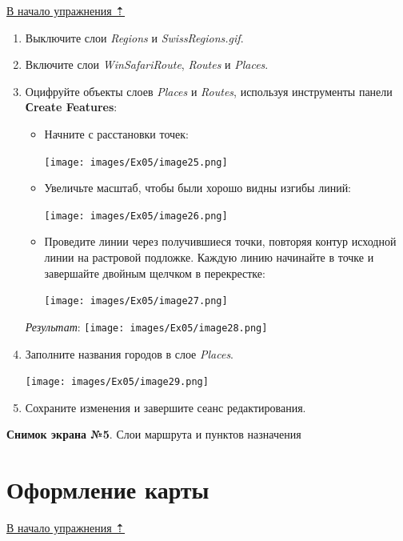 \documentclass[12pt,]{book}
\begin{document}
\protect\hyperlink{map-ref-general}{В начало упражнения ⇡}

\begin{enumerate}
\def\labelenumi{\arabic{enumi}.}
\item
  Выключите слои \emph{Regions} и \emph{SwissRegions.gif}.
\item
  Включите слои \emph{WinSafariRoute}, \emph{Routes} и \emph{Places}.
\item
  Оцифруйте объекты слоев \emph{Places} и \emph{Routes}, используя инструменты панели \textbf{Сreate Features}:

  \begin{itemize}
  \item
    Начните с расстановки точек:

    \texttt{[image: images/Ex05/image25.png]}
  \item
    Увеличьте масштаб, чтобы были хорошо видны изгибы линий:

    \texttt{[image: images/Ex05/image26.png]}
  \item
    Проведите линии через получившиеся точки, повторяя контур исходной линии на растровой подложке. Каждую линию начинайте в точке и завершайте двойным щелчком в перекрестке:

    \texttt{[image: images/Ex05/image27.png]}
  \end{itemize}

  \emph{Результат}:
  \texttt{[image: images/Ex05/image28.png]}
\item
  Заполните названия городов в слое \emph{Places}.

  \texttt{[image: images/Ex05/image29.png]}
\item
  Сохраните изменения и завершите сеанс редактирования.
\end{enumerate}

\textbf{Снимок экрана №5}. Слои маршрута и пунктов назначения

\hypertarget{map-ref-general-design}{%
\section{Оформление карты}\label{map-ref-general-design}}

\protect\hyperlink{map-ref-general}{В начало упражнения ⇡}
\end{document}
